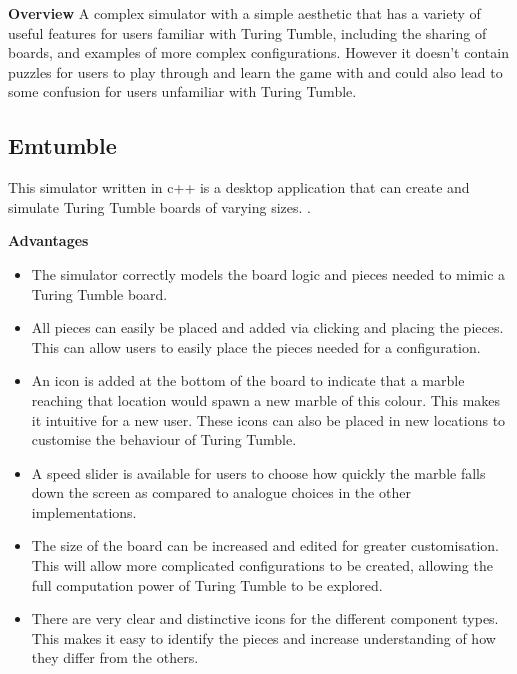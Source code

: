 \documentclass{l4proj}
\begin{document}
\textbf{Overview}
A complex simulator with a simple aesthetic that has a variety of useful features for users familiar with Turing Tumble, including the sharing of boards, and examples of more complex configurations. However it doesn't contain puzzles for users to play through and learn the game with and could also lead to some confusion for users unfamiliar with Turing Tumble.

\subsection{Emtumble}
This simulator written in c++ is a desktop application that can create and simulate Turing Tumble boards of varying sizes. \cite{tomita_oudonemtumble_2020}.

\textbf{Advantages}
\begin{itemize}
    \item The simulator correctly models the board logic and pieces needed to mimic a Turing Tumble board.
    \item All pieces can easily be placed and added via clicking and placing the pieces. This can allow users to easily place the pieces needed for a configuration.
    \item An icon is added at the bottom of the board to indicate that a marble reaching that location would spawn a new marble of this colour. This makes it intuitive for a new user. These icons can also be placed in new locations to customise the behaviour of Turing Tumble.
    \item A speed slider is available for users to choose how quickly the marble falls down the screen as compared to analogue choices in the other implementations.
    \item The size of the board can be increased and edited for greater customisation. This will allow more complicated configurations to be created, allowing the full computation power of Turing Tumble to be explored.
    \item There are very clear and distinctive icons for the different component types. This makes it easy to identify the pieces and increase understanding of how they differ from the others.
\end{itemize}
\end{document}
